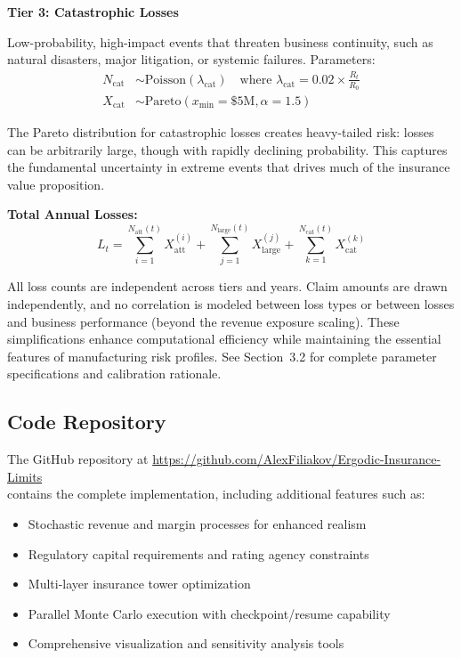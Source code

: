 \documentclass[11pt,letterpaper]{article}
\begin{document}
\vspace{\baselineskip}

\textbf{Tier 3: Catastrophic Losses}

Low-probability, high-impact events that threaten business continuity, such as natural disasters, major litigation, or systemic failures. Parameters:
\begin{align}
N_{\text{cat}} &\sim \text{Poisson}(\lambda_{\text{cat}}) \quad \text{where } \lambda_{\text{cat}} = 0.02 \times \frac{R_t}{R_0} \\
X_{\text{cat}} &\sim \text{Pareto}(x_{\text{min}} = \$5\text{M}, \alpha = 1.5)
\end{align}

The Pareto distribution for catastrophic losses creates heavy-tailed risk: losses can be arbitrarily large, though with rapidly declining probability. This captures the fundamental uncertainty in extreme events that drives much of the insurance value proposition.

\vspace{\baselineskip}

\textbf{Total Annual Losses:}
\begin{equation}
L_t = \sum_{i=1}^{N_{\text{att}}(t)} X_{\text{att}}^{(i)} + \sum_{j=1}^{N_{\text{large}}(t)} X_{\text{large}}^{(j)} + \sum_{k=1}^{N_{\text{cat}}(t)} X_{\text{cat}}^{(k)}
\end{equation}

All loss counts are independent across tiers and years. Claim amounts are drawn independently, and no correlation is modeled between loss types or between losses and business performance (beyond the revenue exposure scaling). These simplifications enhance computational efficiency while maintaining the essential features of manufacturing risk profiles. See Section~3.2 for complete parameter specifications and calibration rationale.

\subsection{Code Repository}\label{sec:code-repo}

The GitHub repository at \url{https://github.com/AlexFiliakov/Ergodic-Insurance-Limits}\\
contains the complete implementation, including additional features such as:
\begin{itemize}
    \item Stochastic revenue and margin processes for enhanced realism
    \item Regulatory capital requirements and rating agency constraints
    \item Multi-layer insurance tower optimization
    \item Parallel Monte Carlo execution with checkpoint/resume capability
    \item Comprehensive visualization and sensitivity analysis tools
\end{itemize}
\end{document}
